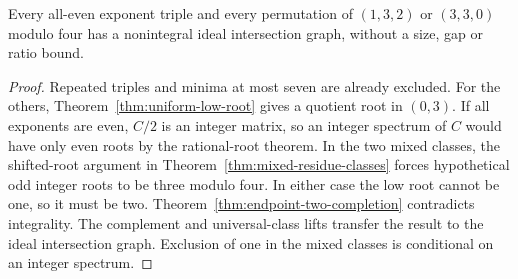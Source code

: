\begin{corollary}
\label{cor:endpoint-two-parity-completion}
Every all-even exponent triple and every permutation of $(1,3,2)$ or
$(3,3,0)$ modulo four has a nonintegral ideal intersection graph,
without a size, gap or ratio bound.
\end{corollary}

\begin{proof}
Repeated triples and minima at most seven are already excluded. For the
others, Theorem~\ref{thm:uniform-low-root} gives a quotient root in
$(0,3)$. If all exponents are even, $C/2$ is an integer matrix, so
an integer spectrum of $C$ would have only even roots by the rational-root
theorem. In the two mixed classes, the shifted-root argument in
Theorem~\ref{thm:mixed-residue-classes} forces hypothetical odd integer
roots to be three modulo four. In either case the low root cannot be one,
so it must be two. Theorem~\ref{thm:endpoint-two-completion} contradicts
integrality. The complement and universal-class lifts transfer the result
to the ideal intersection graph. Exclusion of one in the mixed classes is
conditional on an integer spectrum.
\end{proof}
